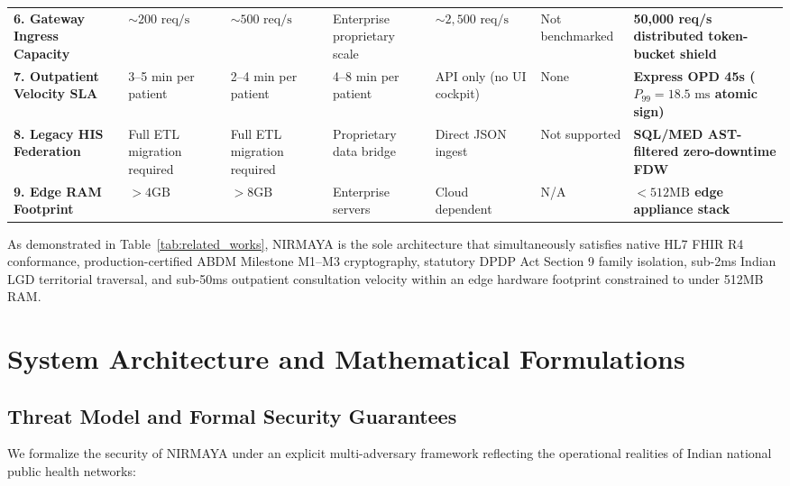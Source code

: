 \documentclass[journal,twocolumn]{IEEEtran}
\begin{document}
\begin{table}[t]
\begin{tabularx}{\textwidth}{l X X X X X X}
\textbf{6. Gateway Ingress Capacity} & $\sim 200\text{ req/s}$ & $\sim 500\text{ req/s}$ & Enterprise proprietary scale & $\sim 2,500\text{ req/s}$ & Not benchmarked & \textbf{50,000 req/s distributed token-bucket shield} \\

\textbf{7. Outpatient Velocity SLA} & 3--5 min per patient & 2--4 min per patient & 4--8 min per patient & API only (no UI cockpit) & None & \textbf{Express OPD 45s ($P_{99} = 18.5\text{ ms}$ atomic sign)} \\

\textbf{8. Legacy HIS Federation} & Full ETL migration required & Full ETL migration required & Proprietary data bridge & Direct JSON ingest & Not supported & \textbf{SQL/MED AST-filtered zero-downtime FDW} \\

\textbf{9. Edge RAM Footprint} & $> 4\text{GB}$ & $> 8\text{GB}$ & Enterprise servers & Cloud dependent & N/A & \textbf{$< 512\text{MB}$ edge appliance stack} \\
\bottomrule
\end{tabularx}
\end{table}

As demonstrated in Table~\ref{tab:related_works}, NIRMAYA is the sole architecture that simultaneously satisfies native HL7 FHIR R4 conformance, production-certified ABDM Milestone M1--M3 cryptography, statutory DPDP Act Section 9 family isolation, sub-2ms Indian LGD territorial traversal, and sub-50ms outpatient consultation velocity within an edge hardware footprint constrained to under 512MB RAM.

\section{System Architecture and Mathematical Formulations}

\subsection{Threat Model and Formal Security Guarantees}
We formalize the security of NIRMAYA under an explicit multi-adversary framework reflecting the operational realities of Indian national public health networks:
\end{document}
